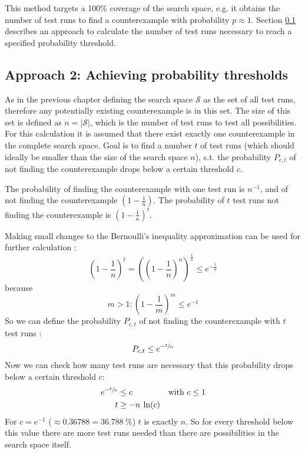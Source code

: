\documentclass{article}
\begin{document}
This method targets a 100\% coverage of the search space, e.g. it obtains the number of test runs to find a counterexample with probability $p\approx1$. Section \ref{subsec:numberoftestruns} describes an approach to calculate the number of test runs necessary to reach a specified probability threshold.

\subsection{Approach 2: Achieving probability thresholds}\label{subsec:numberoftestruns}
As in the previous chapter defining the search space $\mathcal{S}$ as the set of all test runs, therefore any potentially existing counterexample is in this set. The size of this set is defined as $n = |\mathcal{S}|$, which is the number of test runs to test all possibilities.
For this calculation it is assumed that there exist exactly one counterexample in the complete search space.
Goal is to find a number $t$ of test runs (which should ideally be smaller than the size of the search space $n$), s.t. the probability $P_{c,t}$ of not finding the counterexample drops below a certain threshold $c$.

The probability of finding the counterexample with one test run is $n^{-1}$, and of not finding the counterexample $(1-\frac{1}{n})$. The probability of $t$ test runs not finding the counterexample is $(1-\frac{1}{n})^t$.

Making small changes to the Bernoulli's inequality approximation can be used for further calculation \cite{bernoulliwiki}:
\begin{equation}
    (1-\frac{1}{n})^t = ((1-\frac{1}{n})^n)^{\frac{t}{n}} \le e^{-\frac{t}{n}}
\end{equation}
because
\begin{equation*}
m>1: (1-\frac{1}{m})^m \le e^{-1}
\end{equation*}
So we can define the probability $P_{c,t}$ of not finding the counterexample with $t$ test runs \cite{peertopeerlecture}:
\begin{equation}
    P_{c,t} \le e^{-\sfrac{t}{n}}
\end{equation}
Now we can check how many test runs are necessary that this probability drops below a certain threshold $c$:
\begin{align}
    e^{-\sfrac{t}{n}} &\leq c && \text{with $c\le1$} \nonumber\\
    t &\geq -n\:\ln(c) \label{eq:testthreshold}
\end{align}
For $c = e^{-1}$ ($\approx 0.36788 = 36.788\:\%$) $t$ is exactly $n$. So for every threshold below this value there are more test runs needed than there are possibilities in the search space itself.
\end{document}
